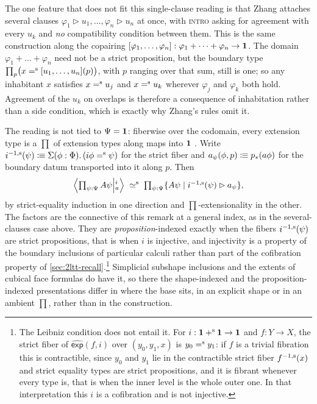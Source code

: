 \begin{remark}
	The one feature that does not fit this single-clause reading is that Zhang
	attaches several clauses $\varphi_1\rhd u_1,\dots,\varphi_n\rhd u_n$ at once,
	with \textsc{intro} asking for agreement with every $u_k$ and \emph{no}
	compatibility condition between them. This is the same construction along the
	copairing $[\varphi_1,\dots,\varphi_n]:\varphi_1+\dots+\varphi_n\to\one$. The
	domain $\varphi_1+\dots+\varphi_n$ need not be a strict proposition, but the
	boundary type $\prod_{p}\bigl(x\seq[u_1,\dots,u_n](p)\bigr)$, with $p$ ranging
	over that sum, still is one; so any inhabitant $x$ satisfies $x\seq u_j$ and
	$x\seq u_k$ wherever $\varphi_j$ and $\varphi_k$ both hold. Agreement of the
	$u_k$ on overlaps is therefore a consequence of inhabitation rather than a side
	condition, which is exactly why Zhang's rules omit it.

	The reading is not tied to $\Psi=\one$: fiberwise over the codomain, every
	extension type is a $\prod$ of extension types along maps into $\one$
	. Write
	$\sfib{i}(\psi)\defeq\Sigma(\phi:\Phi).\,(i\phi\seq\psi)$ for the strict
	fiber and $a_\psi(\phi,p)\defeq p_*(a\phi)$ for the boundary datum
	transported into it along $p$. Then
	\[
		\Ext{i}{\textstyle\prod_{\psi:\Psi}A\psi}{a}
		\;\siso\;
		\textstyle\prod_{\psi:\Psi}\{A\psi\mid\sfib{i}(\psi)\rhd a_\psi\},
	\]
	by strict-equality induction in one direction and $\prod$-extensionality in
	the other. The factors are the connective of this remark at a general index,
	as in the several-clauses case above. They are \emph{proposition}-indexed
	exactly when the fibers $\sfib{i}(\psi)$ are strict propositions, that is
	when $i$ is injective, and injectivity is a property of the boundary
	inclusions of particular calculi rather than part of the cofibration
	property of \cref{sec:2ltt-recall}.\footnote{%
		The Leibniz condition does not entail it. For
		$i:\one+^{\mathrm{s}}\one\to\one$ and $f:Y\to X$, the strict fiber of
		$\widehat{\mathsf{exp}}(f,i)$ over $(y_0,y_1,x)$ is $y_0\seq y_1$: if $f$
		is a trivial fibration this is contractible, since $y_0$ and $y_1$ lie in
		the contractible strict fiber $\sfib{f}(x)$ and strict equality types are
		strict propositions, and it is fibrant whenever every type is, that is
		when the inner level is the whole outer one. In that interpretation this
		$i$ is a cofibration and is not injective.} Simplicial subshape inclusions and the
	extents of cubical face formulas do have it, so there the shape-indexed and
	the proposition-indexed presentations differ in where the base sits, in an
	explicit shape or in an ambient $\prod$, rather than in the construction.


\end{remark}
